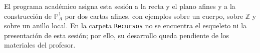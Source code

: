 \begin{nota}
El programa académico asigna esta sesión a la recta y el plano afines y a la construcción de $\mathbb P^1_A$ por dos cartas afines, con ejemplos sobre un cuerpo, sobre $\mathbb Z$ y sobre un anillo local. En la carpeta \texttt{Recursos} no se encuentra el esqueleto ni la presentación de esta sesión; por ello, su desarrollo queda pendiente de los materiales del profesor.
\end{nota}
